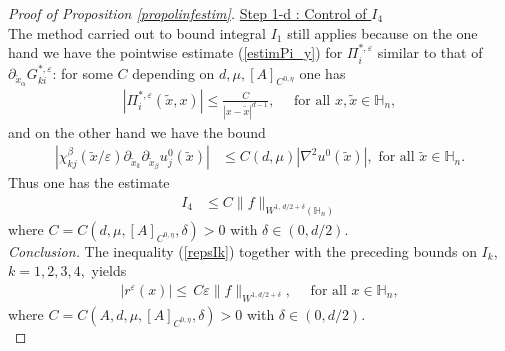 \documentclass[11pt, reqno]{amsart}
\theoremstyle{definition}
\theoremstyle{remark}
\numberwithin{equation}{section}
\begin{document}
\begin{proof}[Proof of Proposition \textup{\ref{propolinfestim}}]
		\noindent \underline{Step 1-d :	Control of $I_4$}\\ The method carried out to bound integral $I_1$ still applies because on the one hand we have the pointwise estimate 
		(\ref{estimPi_y})
		for $\Pi_i^{*,\varepsilon}$ similar to that of $\partial_{\tilde{x}_\alpha} G_{ki}^{*,\varepsilon}$: for some $C$ depending on $d, \mu, [A]_{C^{0,\eta}}$ one has 
		\begin{align*}
			|\Pi_i^{*,\varepsilon}(\tilde{x},x)|\leq\frac{C}{|x- \tilde{x}|^{d-1}}, \quad \mbox{  for all } x,\tilde{x}\in \mathbb{H}_n,
		\end{align*}
		and on the other hand we have the bound
		\begin{align*}
			\left| \chi^\beta_{kj}(\tilde{x}/\varepsilon)\partial_{\tilde{x}_k} \partial_{\tilde{x}_\beta} u_j^0(\tilde{x}) \right|&\leq C (d,\mu)|\nabla^2 u^0(\tilde{x})|, \mbox{  for all } \tilde{x}\in \mathbb{H}_n.
		\end{align*}	
		Thus one has the estimate
		\begin{align*}
			I_4	&\leq   C \|f\|_{W^{1,\,d/2+\delta}(\mathbb{H}_n)}
		\end{align*}	
		where 	$C= C(d, \mu, [A]_{C^{0,\eta}},\delta)>0$	with $\delta\in(0,d/2)$.\\
		
		\noindent \emph{Conclusion.}	The inequality (\ref{repsIk}) together with the preceding bounds on $I_k$, $k=1,2,3,4,$	yields
		\begin{align}\label{boundrepseps}
			|r^\varepsilon (x)| \leq \, C  \varepsilon \| f\|_{W^{1,d/2+\delta}}, \quad \mbox{ for all } x\in \mathbb{H}_n,
		\end{align}
		where 	$C=C(A,d, \mu, [A]_{C^{0,\eta}},\delta)>0$	with $\delta\in(0,d/2)$.\\
		

\end{proof}
\end{document}
